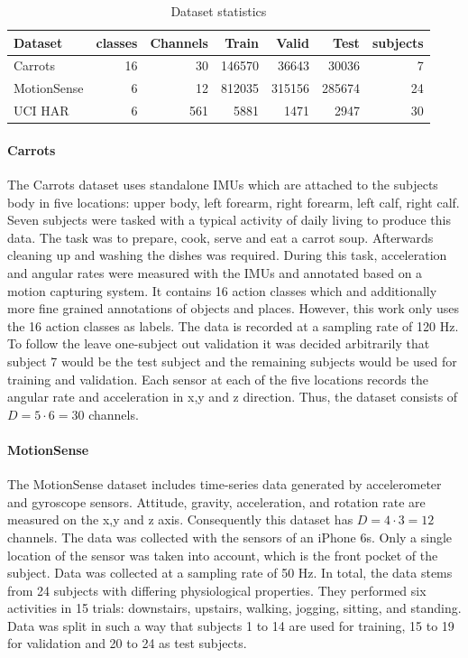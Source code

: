 \documentclass[11pt,titlepage,oneside,openany]{book}
\begin{document}
\begin{table}
	\centering
	\begin{tabularx}{.95\textwidth}{lrrrrrr}
		\toprule
		Dataset & classes & Channels & Train & Valid & Test & subjects \\
		\midrule
		Carrots & 16 & 30 & 146570 & 36643 & 30036 & 7 \\
		MotionSense & 6 & 12 & 812035 & 315156 & 285674 & 24 \\
		UCI HAR & 6 & 561 & 5881 & 1471 & 2947 & 30 \\
		\bottomrule
	\end{tabularx}
	\caption[Dataset statistics]{\label{tab:sets} Dataset statistics}
\end{table}

\paragraph{Carrots}
The Carrots dataset uses standalone IMUs which are attached to the subjects body in five locations: upper body, left forearm, right forearm, left calf, right calf. Seven subjects were tasked with a typical activity of daily living to produce this data.
The task was to prepare, cook, serve and eat a carrot soup. Afterwards cleaning up and washing the dishes was required. During this task, acceleration and angular rates were measured with the IMUs and annotated based on a motion capturing system.
It contains 16 action classes which and additionally more fine grained annotations of objects and places. However, this work only uses the 16 action classes as labels. The data is recorded at a sampling rate of 120 Hz. To follow the leave one-subject out validation it was decided arbitrarily that subject 7 would be the test subject and the remaining subjects would be used for training and validation. Each sensor at each of the five locations records the angular rate and acceleration in x,y and z direction. Thus, the dataset consists of $D = 5 \cdot 6 = 30$ channels.

\paragraph{MotionSense}
The MotionSense dataset includes time-series data generated by accelerometer and gyroscope sensors. Attitude, gravity, acceleration, and rotation rate are measured on the x,y and z axis. Consequently this dataset has $D = 4 \cdot 3 = 12$ channels. The data was collected with the sensors of an iPhone 6s. Only a single location of the sensor was taken into account, which is the front pocket of the subject. Data was collected at a sampling rate of 50 Hz. In total, the data stems from 24 subjects with differing physiological properties. They performed six activities in 15 trials: downstairs, upstairs, walking, jogging, sitting, and standing. Data was split in such a way that subjects 1 to 14 are used for training, 15 to 19 for validation and  20 to 24 as test subjects.
\end{document}
